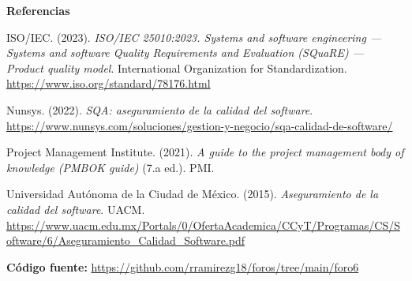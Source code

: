 \documentclass[12pt,letterpaper]{article}
\newcommand{\subtitulo}[1]{\vspace{12pt}\noindent\textbf{#1}\par\vspace{10pt}}
\begin{document}
\subtitulo{Referencias}

\hangindent=1cm \noindent ISO/IEC. (2023). \textit{ISO/IEC 25010:2023. Systems and software engineering — Systems and software Quality Requirements and Evaluation (SQuaRE) — Product quality model}. International Organization for Standardization. \url{https://www.iso.org/standard/78176.html}

\vspace{4pt}
\hangindent=1cm \noindent Nunsys. (2022). \textit{SQA: aseguramiento de la calidad del software}. \url{https://www.nunsys.com/soluciones/gestion-y-negocio/sqa-calidad-de-software/}

\vspace{4pt}
\hangindent=1cm \noindent Project Management Institute. (2021). \textit{A guide to the project management body of knowledge (PMBOK guide)} (7.a ed.). PMI.

\vspace{4pt}
\hangindent=1cm \noindent Universidad Autónoma de la Ciudad de México. (2015). \textit{Aseguramiento de la calidad del software}. UACM. \url{https://www.uacm.edu.mx/Portals/0/OfertaAcademica/CCyT/Programas/CS/Software/6/Aseguramiento_Calidad_Software.pdf}

\vspace{14pt}
\noindent\small \textbf{Código fuente:} \url{https://github.com/rramirezg18/foros/tree/main/foro6}
\end{document}
